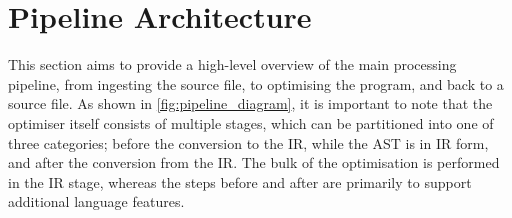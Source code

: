 \section{Pipeline Architecture}
\label{sec:pipeline_arch}

This section aims to provide a high-level overview of the main processing pipeline, from ingesting the source file, to optimising the program, and back to a source file.
As shown in \autoref{fig:pipeline_diagram}, it is important to note that the optimiser itself consists of multiple stages, which can be partitioned into one of three categories; before the conversion to the IR, while the AST is in IR form, and after the conversion from the IR.
The bulk of the optimisation is performed in the IR stage, whereas the steps before and after are primarily to support additional language features.

